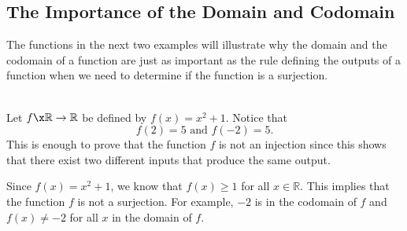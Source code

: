 \subsection*{The Importance of the Domain and Codomain}
The functions in the next two examples will illustrate why the domain and the codomain of a function are just as important as the rule defining the outputs of a function when we need to determine if the function is a surjection.

\begin{example}\label{E:domainandcodomain} \hfill \\
Let  $f\x \mathbb{R} \to \mathbb{R}$  be defined by  $f( x ) = x^2  + 1$.  Notice that  
\[
f( 2 ) = 5  \text{ and } f( { - 2} ) = 5.
\]
This is enough to prove that the function  $f$  is not an injection since this shows that there exist two different inputs that produce the same output.

Since  $f( x ) = x^2  + 1$, we know that  $f( x ) \geq 1$ for all $x \in \mathbb{R}$.  This implies that the function  $f$  is not a surjection.  For example,  $ - 2$
  is in the codomain of  $f$  and  $f( x ) \ne  - 2$ for all  $x$  in the domain of  $f$\!.  
\end{example}

